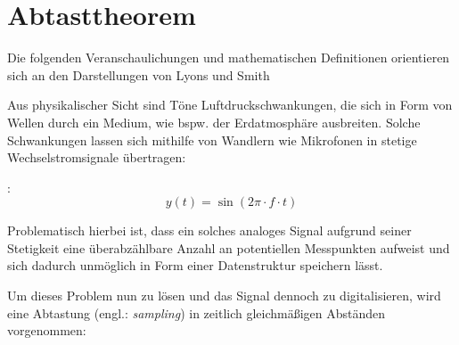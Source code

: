 \section{Abtasttheorem}

Die folgenden Veranschaulichungen und mathematischen Definitionen orientieren sich an den Darstellungen von
Lyons \cite[Kap. 1]{lyons2010} und Smith \cite[Kap. 3]{smith1997}

Aus physikalischer Sicht sind Töne Luftdruckschwankungen, die sich in Form von Wellen durch ein Medium, wie
bspw. der Erdatmosphäre ausbreiten. Solche Schwankungen lassen sich mithilfe von Wandlern wie Mikrofonen in
stetige Wechselstromsignale übertragen:

\cite[Kap. 1]{lyons2010}:
\begin{equation}
    y(t) = \sin(2\pi \cdot f \cdot t)
    \label{eq:stetige_gleichung}
\end{equation}

Problematisch hierbei ist, dass ein solches analoges Signal aufgrund seiner Stetigkeit eine überabzählbare
Anzahl an potentiellen Messpunkten aufweist und sich dadurch unmöglich in Form einer Datenstruktur speichern lässt.

Um dieses Problem nun zu lösen und das Signal dennoch zu digitalisieren,
wird eine Abtastung (engl.: \textit{sampling})
in zeitlich gleichmäßigen Abständen vorgenommen: